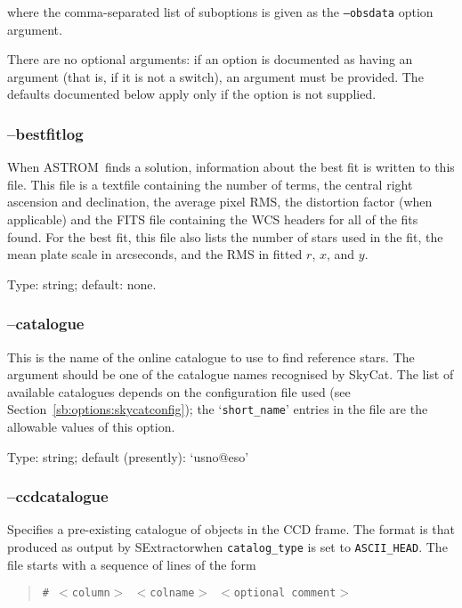 \documentclass[twoside,11pt]{article}
\newcommand{\htmladdnormallink}[2]{#1}
\newcommand{\xref}[3]{#1}
\newcommand{\xlabel}[1]{}
\newcommand{\ASTROM}{{\footnotesize ASTROM}\normalsize}
\newcommand{\SExtractor}{\xref{{\footnotesize SExtractor}}{sun226}}
\newcommand{\SkyCat}{\htmladdnormallink{SkyCat}{http://archive.eso.org/skycat/}}
\begin{document}
where the comma-separated list of suboptions is given as the
\texttt{--obsdata} option argument.

There are no optional arguments: if an option is documented as having an
argument (that is, if it is not a switch), an argument must be provided.  The
defaults documented below apply only if the option is not supplied.

\subsubsection{\xlabel{sb_options_bestfitlog}--bestfitlog\label{sb:options:bestfitlog}}

When \ASTROM\ finds a solution, information about the best fit is written to
this file. This file is a textfile containing the number of terms, the central
right ascension and declination, the average pixel RMS, the distortion factor
(when applicable) and the FITS file containing the WCS headers for all of the
fits found. For the best fit, this file also lists the number of stars used in
the fit, the mean plate scale in arcseconds, and the RMS in fitted $r$, $x$,
and $y$.

Type: string; default: none.

\subsubsection{\xlabel{sb_options_catalogue}--catalogue\label{sb:options:catalogue}}

This is the name of the online catalogue to use to find reference stars.  The
argument should be one of the catalogue names recognised by \SkyCat.  The list
of available catalogues depends on the configuration file used (see
Section~\ref{sb:options:skycatconfig}); the `\texttt{short\_name}' entries in
the file are the allowable values of this option.

Type: string; default (presently): `usno@eso'

\subsubsection{\xlabel{sb_options_ccdcatalogue}--ccdcatalogue\label{sb:options:ccdcatalogue}}

Specifies a pre-existing catalogue of objects in the CCD frame. The format is
that produced as output by \SExtractor\ when \texttt{catalog\_type} is set to
\texttt{ASCII\_HEAD}. The file starts with a sequence of lines of the form
\begin{quote}
\texttt{\# $<$column$>$ $<$colname$>$ $<$optional comment$>$}
\end{quote}
\end{document}
